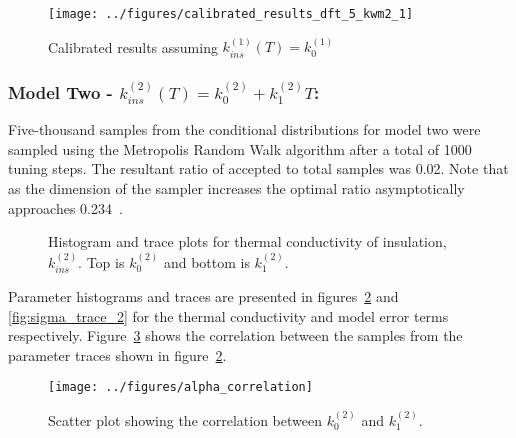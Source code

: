 \documentclass[article]{proc}
\begin{document}
        \begin{figure}[!]
            \centering
            \texttt{[image: ../figures/calibrated\_results\_dft\_5\_kwm2\_1]}
            \caption{Calibrated results assuming $k^{(1)}_{ins}(T) = k^{(1)}_0$}
            \label{fig:cal_results_1}
        \end{figure}

        \subsubsection{Model Two - $k^{(2)}_{ins}(T) = k^{(2)}_0 + k^{(2)}_1 T$:}

        Five-thousand samples from the conditional distributions for model two were sampled using the Metropolis Random Walk algorithm after a total of 1000 tuning steps. The resultant ratio of accepted to total samples was 0.02. Note that as the dimension of the sampler increases the optimal ratio asymptotically approaches 0.234~\cite{Roberts:1997}. 

        \begin{figure}[b!]
            \centering
            \qquad

            \qquad
            \caption{Histogram and trace plots for thermal conductivity of insulation, $k^{(2)}_{ins}$. Top is $k^{(2)}_0$ and bottom is $k^{(2)}_1$.}
            \label{fig:param_trace_2}
        \end{figure}

        Parameter histograms and traces are presented in figures~\ref{fig:param_trace_2} and \ref{fig:sigma_trace_2} for the thermal conductivity and model error terms respectively. Figure~\ref{fig:alpha_correlation} shows the correlation between the samples from the parameter traces shown in figure~\ref{fig:param_trace_2}. 

        \begin{figure}[h!]
            \centering
            \texttt{[image: ../figures/alpha\_correlation]}
            \caption{Scatter plot showing the correlation between $k^{(2)}_0$ and $k^{(2)}_1$.}
            \label{fig:alpha_correlation}
        \end{figure}
\end{document}
